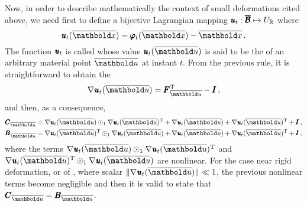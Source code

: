 Now, in order to describe mathematically the context of small deformations cited above, we need first to define a bijective Lagrangian mapping $\pmb{\mathit{u}}_t : \pmb{\overline{\mathcal{B}}} \mapsto U_{\mathbb{R}}$ where 
\begin{equation}
 \fua{\tnr{\mathit{u}}_t}{\overline{\vto{x}}}=\fua{\tnr{\varphi}_t}{\overline{\vto{x}}} - \overline{\vto{x}}\,.
 \end{equation} 
 The function $\pmb{\mathit{u}}_t$ is called  whose value $\fua{\tnr{\mathit{u}}_t}{\overline{\vto{u}}}$ is said to be the  of an arbitrary material point $\overline{\vto{u}}$ at instant $t$. From the previous rule, it is straightforward to obtain the        
\begin{equation}
\fua{\nabla\tnr{\mathit{u}}_t}{\overline{\vto{u}}}=\tnr{F}_{\overline{\vto{u}}}^{\text{T}} - \tnr{I}\,,
\end{equation} 
and then, as a consequence, 
\begin{equation} 
\begin{aligned} 
\tnr{C}_{\overline{\vto{u}}}&=\fua{\nabla\tnr{\mathit{u}}_t}{\overline{\vto{u}}}\odot_1\fua{\nabla\tnr{\mathit{u}}_t}{\overline{\vto{u}}}^{\text{T}}+\fua{\nabla\tnr{\mathit{u}}_t}{\overline{\vto{u}}}+\fua{\nabla\tnr{\mathit{u}}_t}{\overline{\vto{u}}}^{\text{T}}+\tnr{I}\,,\\
\tnr{B}_{\overline{\vto{u}}}&=\fua{\nabla\tnr{\mathit{u}}_t}{\overline{\vto{u}}}^{\text{T}}\odot_1\fua{\nabla\tnr{\mathit{u}}_t}{\overline{\vto{u}}}+\fua{\nabla\tnr{\mathit{u}}_t}{\overline{\vto{u}}}+\fua{\nabla\tnr{\mathit{u}}_t}{\overline{\vto{u}}}^{\text{T}}+\tnr{I}\,,
\end{aligned}
\end{equation}
where the terms $\fua{\nabla\tnr{\mathit{u}}_t}{\overline{\vto{u}}}\odot_1\fua{\nabla\tnr{\mathit{u}}_t}{\overline{\vto{u}}}^{\text{T}}$ and $\fua{\nabla\tnr{\mathit{u}}_t}{\overline{\vto{u}}}^{\text{T}}\odot_1\fua{\nabla\tnr{\mathit{u}}_t}{\overline{\vto{u}}}$ are nonlinear. For the case near rigid deformation, or of , where scalar $\|\fua{\nabla\tnr{\mathit{u}}_t}{\overline{\vto{u}}}\|\ll 1$, the previous nonlinear terms become negligible and then it is valid to state that $\tnr{C}_{\overline{\vto{u}}}=\tnr{B}_{\overline{\vto{u}}}$.




